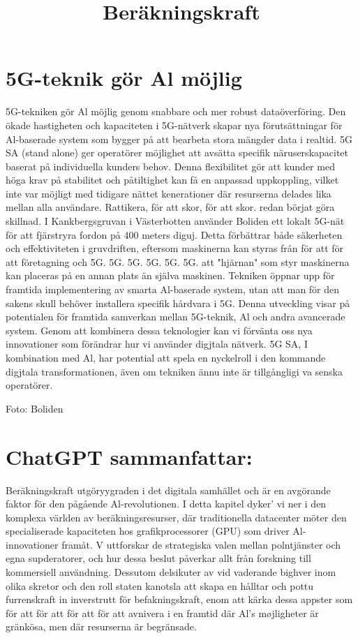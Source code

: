 {{\section*{5G-teknik gör Al möjlig}
5G-tekniken gör Al möjlig genom snabbare och mer robust dataöverföring. Den ökade hastigheten och kapaciteten i 5G-nätverk skapar nya förutsättningar för Al-baserade system som bygger på att bearbeta stora mängder data i realtid. 5G SA (stand alone) ger operatörer möjlighet att avsätta specifik näruserskapacitet baserat på individuella kunders behov. Denna flexibilitet gör att kunder med höga krav på stabilitet och påtiltighet kan få en anpassad uppkoppling, vilket inte var möjligt med tidigare nättet kenerationer där resurserna delades lika mellan alla användare.
Rattikera, för att skor, för att skor.
redan börjat göra skillnad. I Kankbergsgruvan i Västerbotten använder Boliden ett lokalt 5G-nät för att fjärstryra fordon på 400 meters diguj. Detta förbättrar både säkerheten och effektiviteten i gruvdriften, eftersom maskinerna kan styras från för att för att företagning och 5G. 5G. 5G. 5G. 5G. 5G.
att "hjärnan" som styr maskinerna kan placeras på en annan plats än själva maskinen. Tekniken öppnar upp för framtida implementering av smarta Al-baserade system, utan att man för den sakens skull behöver installera specifik hårdvara i 5G.
Denna utveckling visar på potentialen för framtida samverkan mellan 5G-teknik, Al och andra avancerade system. Genom att kombinera dessa teknologier kan vi förvänta oss nya innovationer som förändrar hur vi använder digjtala nätverk. 5G SA, I kombination med Al, har potential att spela en nyckelroll i den kommande digjtala transformationen, även om tekniken ännu inte är tillgångligi va senska operatörer.

Foto: Boliden

\title{
Beräkningskraft
}
\section*{ChatGPT sammanfattar:}
Beräkningskraft utgöryygraden i det digitala samhället och är en avgörande faktor för den pågående Al-revolutionen.
I detta kapitel dyker' vi ner i den komplexa världen av beräkningsresurser, där traditionella datacenter möter den specialiserade kapaciteten hos grafikprocessorer (GPU) som driver Al-innovationer framåt. V uttforskar de strategiska valen mellan polntjänster och egna supderatorer, och hur dessa beslut påverkar allt från forskning till kommersiell användning. Dessutom delsikuter av vid vaderande bighver inom olika skretor och den roll staten kanotsla att skapa en hålltar och pottu furrenskraft in inverstrutt för befakningskraft, enom att kärka dessa appster som för att för att för att för att avnivera i en framtid där Al's møjligheter är gränkösa, men där resurserna är begränsade.
}}
